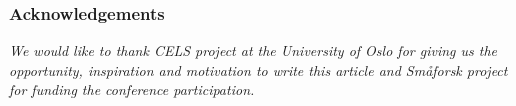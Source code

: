 \documentclass[a0,portrait]{a0poster}
\begin{document}
\begin{multicols}{2}
\nocite{*} %

\subsubsection*{Acknowledgements}

\textit{We would like to thank CELS project at the University of Oslo for giving us the opportunity, inspiration and motivation to write this article and Sm\aa forsk project for funding the conference participation.}



\end{multicols}
\end{document}
